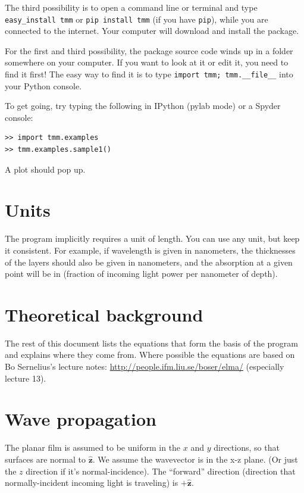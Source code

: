 \documentclass[12pt]{article}
\renewcommand{\(}{\left(}
\renewcommand{\)}{\right)}
\newcommand{\z}{\hat{\mathbf{z}}}
\begin{document}
The third possibility is to open a command line or terminal and type \verb=easy_install tmm= or \verb=pip install tmm= (if you have \verb=pip=), while you are connected to the internet. Your computer will download and install the package.

For the first and third possibility, the package source code winds up in a folder somewhere on your computer. If you want to look at it or edit it, you need to find it first! The easy way to find it is to type \verb=import tmm; tmm.__file__= into your Python console.

To get going, try typing the following in IPython (pylab mode) or a Spyder console:

\begin{verbatim}
>> import tmm.examples
>> tmm.examples.sample1()
\end{verbatim}

A plot should pop up.

\section{Units}

The program implicitly requires a unit of length. You can use any unit, but keep it consistent. For example, if wavelength is given in nanometers, the thicknesses of the layers should also be given in nanometers, and the absorption at a given point will be in (fraction of incoming light power per nanometer of depth).

\section{Theoretical background}

The rest of this document lists the equations that form the basis of the program and explains where they come from. Where possible the equations are based on Bo Sernelius's lecture notes: \url{http://people.ifm.liu.se/boser/elma/} (especially lecture 13).

\section{Wave propagation}

The planar film is assumed to be uniform in the $x$ and $y$ directions, so that surfaces are normal to $\z$. We assume the wavevector is in the x-z plane. (Or just the $z$ direction if it's normal-incidence). The ``forward'' direction (direction that normally-incident incoming light is traveling) is $+\z$.
\end{document}
